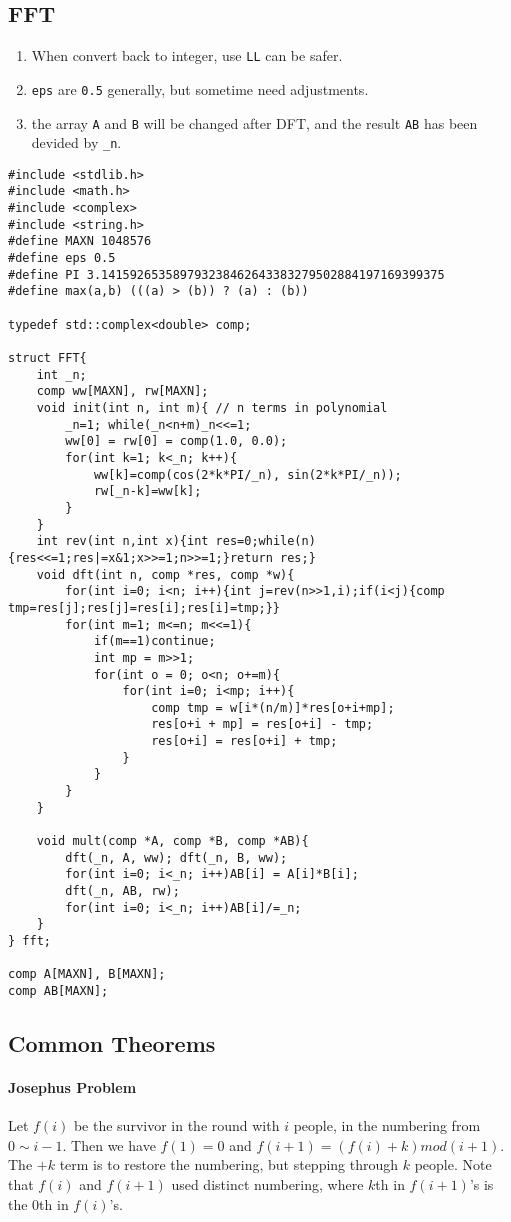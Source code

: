 \subsection{FFT}
\begin{enumerate}
\itemsep-0.5em
\item When convert back to integer, use \lstinline{LL} can be safer.
\item \lstinline{eps} are \lstinline{0.5} generally, but sometime need adjustments.
\item the array \lstinline{A} and \lstinline{B} will be changed after DFT, and the result \lstinline{AB} has been devided by \lstinline{_n}.
\end{enumerate}
\begin{lstlisting}
#include <stdlib.h>
#include <math.h>
#include <complex>
#include <string.h>
#define MAXN 1048576
#define eps 0.5
#define PI 3.141592653589793238462643383279502884197169399375
#define max(a,b) (((a) > (b)) ? (a) : (b))

typedef std::complex<double> comp;

struct FFT{
	int _n;
	comp ww[MAXN], rw[MAXN];
	void init(int n, int m){ // n terms in polynomial
		_n=1; while(_n<n+m)_n<<=1;
		ww[0] = rw[0] = comp(1.0, 0.0);
		for(int k=1; k<_n; k++){
			ww[k]=comp(cos(2*k*PI/_n), sin(2*k*PI/_n));
			rw[_n-k]=ww[k];
		}
	}
	int rev(int n,int x){int res=0;while(n){res<<=1;res|=x&1;x>>=1;n>>=1;}return res;}
	void dft(int n, comp *res, comp *w){
		for(int i=0; i<n; i++){int j=rev(n>>1,i);if(i<j){comp tmp=res[j];res[j]=res[i];res[i]=tmp;}}
		for(int m=1; m<=n; m<<=1){ 
			if(m==1)continue;
			int mp = m>>1;
			for(int o = 0; o<n; o+=m){
				for(int i=0; i<mp; i++){
					comp tmp = w[i*(n/m)]*res[o+i+mp];
					res[o+i + mp] = res[o+i] - tmp;
					res[o+i] = res[o+i] + tmp;
				}
			}
		}
	}

	void mult(comp *A, comp *B, comp *AB){
		dft(_n, A, ww); dft(_n, B, ww);
		for(int i=0; i<_n; i++)AB[i] = A[i]*B[i];
		dft(_n, AB, rw);
		for(int i=0; i<_n; i++)AB[i]/=_n;
	}
} fft;

comp A[MAXN], B[MAXN];
comp AB[MAXN];
\end{lstlisting}
\subsection{Common Theorems}
\paragraph{Josephus Problem}
Let $f(i)$ be the survivor in the round with $i$ people, in the numbering from $0\sim i-1$. Then we have $f(1) = 0$ and $f(i+1) = (f(i)+k) mod (i+1)$. The $+k$ term is to restore the numbering, but stepping through $k$ people. Note that $f(i)$ and $f(i+1)$ used distinct numbering, where $k$th in $f(i+1)$'s is the $0$th in $f(i)$'s.
